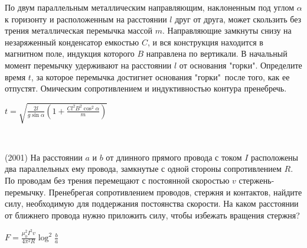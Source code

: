 \begin{ex}
По двум параллельным металлическим направляющим, наклоненным под углом $\alpha$ к горизонту и 
расположенным на расстоянии $l$ друг от друга, может скользить без трения металлическая перемычка массой $m$. 
Направляющие замкнуты снизу на незаряженный конденсатор емкостью $C$, и вся конструкция находится в магнитном поле, индукция которого $B$ направлена по вертикали. В начальный момент перемычку удерживают на расстоянии $l$ от основания "горки". 
Определите время $t$, за которое перемычка достигнет основания "горки"\ после того, как ее отпустят. 
Омическим сопротивлением и индуктивностью контура пренебречь.
\begin{center}

\end{center}
\begin{ans}
$t=\sqrt{\frac{2l}{g \sin \alpha} \left( 1 + \frac{C l^2B^2 \cos^2 \alpha}{m} \right)}$
\end{ans}
\end{ex}

\begin{samepage}
\begin{ex}
\hspace{0pt} \\
\begin{minipage}{.65\textwidth}
(2001) На расстоянии $a$ и $b$ от длинного прямого провода с током $I$ расположены два параллельных ему провода, 
замкнутые с одной стороны сопротивлением $R$. По проводам без трения перемещают с постоянной скоростью $v$ стержень-перемычку. 
Пренебрегая сопротивлением проводов, стержня и контактов, найдите силу, необходимую для поддержания постоянства скорости. 
На каком расстоянии от ближнего провода нужно приложить силу, чтобы избежать вращения стержня?
\end{minipage}
\begin{minipage}{.35\textwidth}
\centering

\end{minipage}
\begin{ans}
$F=\frac{\mu_0^2 I^2 v}{4 \pi^2 R} \log^2 \frac{b}{a}$
\end{ans}
\end{ex}
\end{samepage}


